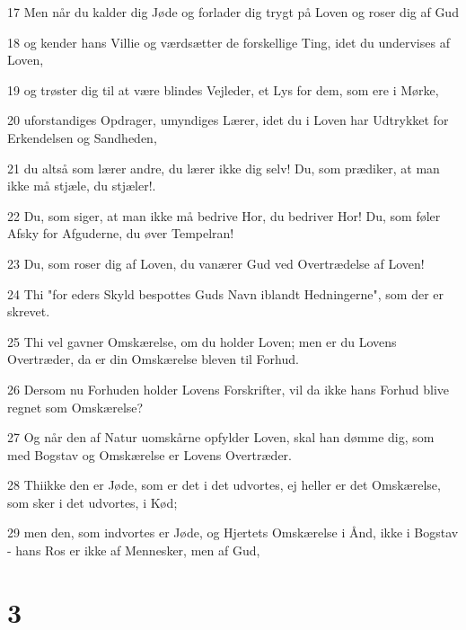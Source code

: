 \par 17 Men når du kalder dig Jøde og forlader dig trygt på Loven og roser dig af Gud
\par 18 og kender hans Villie og værdsætter de forskellige Ting, idet du undervises af Loven,
\par 19 og trøster dig til at være blindes Vejleder, et Lys for dem, som ere i Mørke,
\par 20 uforstandiges Opdrager, umyndiges Lærer, idet du i Loven har Udtrykket for Erkendelsen og Sandheden,
\par 21 du altså som lærer andre, du lærer ikke dig selv! Du, som prædiker, at man ikke må stjæle, du stjæler!.
\par 22 Du, som siger, at man ikke må bedrive Hor, du bedriver Hor! Du, som føler Afsky for Afguderne, du øver Tempelran!
\par 23 Du, som roser dig af Loven, du vanærer Gud ved Overtrædelse af Loven!
\par 24 Thi "for eders Skyld bespottes Guds Navn iblandt Hedningerne", som der er skrevet.
\par 25 Thi vel gavner Omskærelse, om du holder Loven; men er du Lovens Overtræder, da er din Omskærelse bleven til Forhud.
\par 26 Dersom nu Forhuden holder Lovens Forskrifter, vil da ikke hans Forhud blive regnet som Omskærelse?
\par 27 Og når den af Natur uomskårne opfylder Loven, skal han dømme dig, som med Bogstav og Omskærelse er Lovens Overtræder.
\par 28 Thiikke den er Jøde, som er det i det udvortes, ej heller er det Omskærelse, som sker i det udvortes, i Kød;
\par 29 men den, som indvortes er Jøde, og Hjertets Omskærelse i Ånd, ikke i Bogstav - hans Ros er ikke af Mennesker, men af Gud,

\chapter{3}

